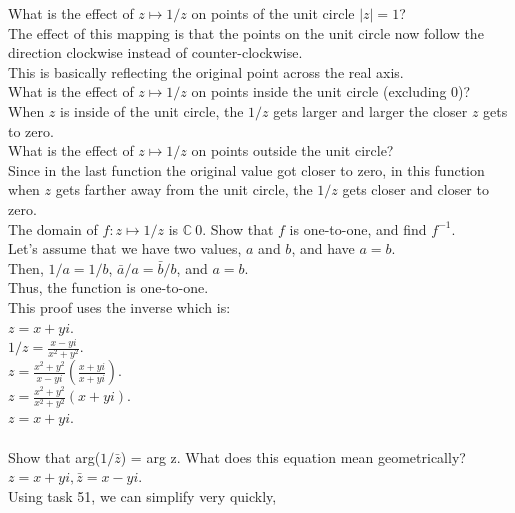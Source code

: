 \documentclass[12pt]{article}
\begin{document}
 What is the effect of $z \mapsto 1/z$ on points of the unit circle $|z| = 1$?\\

The effect of this mapping is that the points on the unit circle now follow the direction clockwise instead of counter-clockwise.\\
This is basically reflecting the original point across the real axis.\\


 What is the effect of $z \mapsto 1/z$ on points inside the unit circle (excluding 0)?\\

When $z$ is inside of the unit circle, the $1/z$ gets larger and larger the closer $z$ gets to zero.\\

What is the effect of $z \mapsto 1/z$ on points outside the unit circle?\\

Since in the last function the original value got closer to zero, in this function when $z$ gets farther away from the unit circle, the $1/z$ gets closer and closer to zero.\\


 The domain of $f: z \mapsto 1/z$ is $\mathbb{C} \ {0}$. Show that $f$ is one-to-one, and find $f^{-1}$.\\

Let's assume that we have two values, $a$ and $b$, and have $a = b$.\\
Then, $1/a = 1/b$, $\bar{a}/a = \bar{b}/b$, and $a = b$.\\
Thus, the function is one-to-one.\\

This proof uses the inverse which is: \\
$z = x + yi$.\\
$1/z = \frac{x-yi}{x^2+y^2}$.\\
$z = \frac{x^2+y^2}{x-yi} (\frac{x+yi}{x+yi})$.\\
$z = \frac{x^2+y^2}{x^2+y^2} (x+yi) $.\\
$z = x+yi$.\\

\\


 Show that arg($1/\bar{z}$) = arg z. What does this equation mean geometrically?\\
$z = x + yi, \bar{z} = x - yi$.\\
Using task 51, we can simplify very quickly,\\
\end{document}
